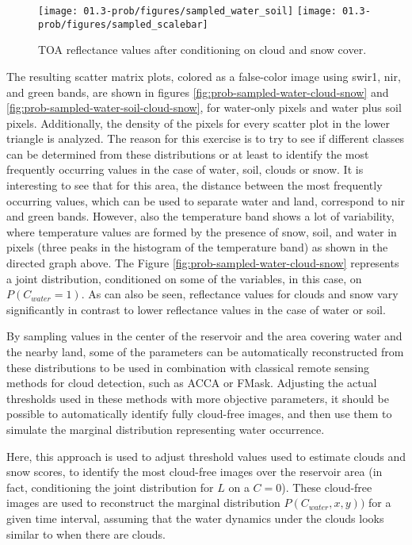 \begin{figure}[H]
	\texttt{[image: 01.3-prob/figures/sampled\_water\_soil]}
	\texttt{[image: 01.3-prob/figures/sampled\_scalebar]}

	\caption{TOA reflectance values after conditioning on cloud and snow cover.}
	
	\label{fig:prob-sampled-water-soil}
\end{figure}


The resulting scatter matrix plots, colored as a false-color image using swir1, nir, and green bands, are shown in figures \ref{fig:prob-sampled-water-cloud-snow} and \ref{fig:prob-sampled-water-soil-cloud-snow}, for water-only pixels and water plus soil pixels. Additionally, the density of the pixels for every scatter plot in the lower triangle is analyzed. The reason for this exercise is to try to see if different classes can be determined from these distributions or at least to identify the most frequently occurring values in the case of water, soil, clouds or snow. It is interesting to see that for this area, the distance between the most frequently occurring values, which can be used to separate water and land, correspond to nir and green bands. However, also the temperature band shows a lot of variability, where temperature values are formed by the presence of snow, soil, and water in pixels (three peaks in the histogram of the temperature band) as shown in the directed graph above. The Figure \ref{fig:prob-sampled-water-cloud-snow} represents a joint distribution, conditioned on some of the variables, in this case, on $P(C_{water}=1)$. As can also be seen, reflectance values for clouds and snow vary significantly in contrast to lower reflectance values in the case of water or soil. 

By sampling values in the center of the reservoir and the area covering water and the nearby land, some of the parameters can be automatically reconstructed from these distributions to be used in combination with classical remote sensing methods for cloud detection, such as ACCA or FMask. Adjusting the actual thresholds used in these methods with more objective parameters, it should be possible to automatically identify fully cloud-free images, and then use them to simulate the marginal distribution representing water occurrence. 

Here, this approach is used to adjust threshold values used to estimate clouds and snow scores, to identify the most cloud-free images over the reservoir area (in fact, conditioning the joint distribution for $L$ on a $C=0$). These cloud-free images are used to reconstruct the marginal distribution $P(C_{water}, x, y))$ for a given time interval, assuming that the water dynamics under the clouds looks similar to when there are clouds.

